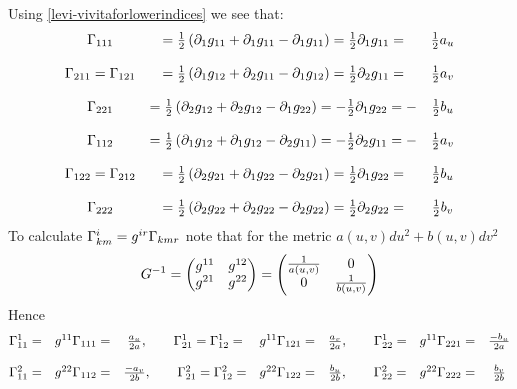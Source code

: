 \documentclass[12pt]{article}
\theoremstyle{theorem}
\numberwithin{equation}{section}
\begin{document}
 Using  \eqref{levi-vivitaforlowerindices} we see that:
                       \begin{equation}\label{explicitcalculationofchristoffel}
                       \begin{matrix}
        \Gamma_{111}&={1\over 2}\left(\partial_{1} g_{11}+\partial_{1} g_{11}-\partial_{1} g_{11}\right)=
        {1\over 2}\partial_{1} g_{11}=&{1\over 2}a_u\\
             &\\
        \Gamma_{211}=\Gamma_{121}&={1\over 2}\left(\partial_{1} g_{12}+
        \partial_{2} g_{11}-\partial_{1} g_{12}\right)=
        {1\over 2}\partial_{2} g_{11}=&{1\over 2}a_v\\
           &\\
\Gamma_{221}&={1\over 2}\left(\partial_{2} g_{12}+\partial_{2} g_{12}-\partial_{1} g_{22}\right)=
        -{1\over 2}\partial_{1} g_{22}=-&{1\over 2}b_u\\ &\\
        \Gamma_{112}&={1\over 2}\left(\partial_{1} g_{12}+\partial_{1} g_{12}-\partial_{2} g_{11}\right)=
        -{1\over 2}\partial_{2} g_{11}=-&{1\over 2}a_v\\&\\
        \Gamma_{122}=\Gamma_{212}&=
        {1\over 2}\left(\partial_{2} g_{21}+\partial_{1} g_{22}-\partial_{2} g_{21}\right)=
        {1\over 2}\partial_{1} g_{22}=&{1\over 2}b_u\\&\\
        \Gamma_{222}&={1\over 2}\left(\partial_{2} g_{22}+\partial_{2} g_{22}-\partial_{2} g_{22}\right)=
        {1\over 2}\partial_{2} g_{22}=&{1\over 2}b_v\\
                           \end {matrix}
                       \end{equation}
To calculate ${\Gamma}^i_{km}=g^{ir}\Gamma_{kmr}$ note that for the metric
$a(u,v)du^2+b(u,v)dv^2$
        $$
          G^{-1}=\begin{pmatrix}
                       g^{11} &g^{12}\\
                       g^{21}  &g^{22}\\
                     \end{pmatrix}=
         \begin{pmatrix}
                       {1\over a(u,v)} &0\\
                       0  &{1\over b(u,v)}\\
                     \end{pmatrix}
              $$
Hence
\begin{equation}\label{christophelfortwodimensionalmetric}
      \begin{matrix}
  \Gamma^{1}_{11}=&g^{11}\Gamma_{111}=&{a_u\over 2a},\qquad
  \Gamma^1_{21}=\Gamma^{1}_{12}=&g^{11}\Gamma_{121}=&{a_v\over 2a},\qquad
  \Gamma^{1}_{22}=&g^{11}\Gamma_{221}=&{-b_u\over 2a}\\&&&&&&\\
  \Gamma^{2}_{11}=&g^{22}\Gamma_{112}=&{-a_v\over 2b},\qquad
  \Gamma^2_{21}=\Gamma^{2}_{12}=&g^{22}\Gamma_{122}=&{b_u\over 2b},\qquad
  \Gamma^{2}_{22}=&g^{22}\Gamma_{222}=&{b_v\over 2b}\\
  \end{matrix}
\end{equation}
\end{document}
